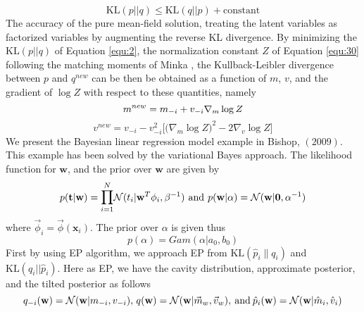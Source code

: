 \documentclass[]{article}
\begin{document}
\begin{equation}
	\text{KL}(p||q) \leq \text{KL}(q||p) + \text{constant}
	\label{equ:2}
\end{equation}
The accuracy of the pure mean-field solution, treating the latent variables as factorized variables by augmenting the reverse KL divergence. 
By minimizing the $\text{KL}(p||q)$ of Equation \ref{equ:2}, the normalization constant $Z$ of Equation \ref{equ:30} following the matching moments of Minka \cite{minka2001ep}, the Kullback-Leibler divergence between $p$ and $q^{new}$ can be then be obtained as a function of $m$, $v$, and the gradient of $\log Z$ with respect to these quantities, namely
\begin{equation}
	m^{new} = m_{-i} + v_{-i} \nabla_m \log Z
	\notag
\end{equation}
\begin{equation}
	v^{new} = v_{-i} - v_{-i}^2 \bigg[\bigg(\nabla_m \log Z\bigg)^2 - 2\nabla_v \log Z\bigg]
	\label{equ:3}
\end{equation}
We present the Bayesian linear regression model example in Bishop, $(2009)$. This example has been solved by the variational Bayes approach. The likelihood function for $\mathbf{w}$, and the prior over $\mathbf{w}$ are given by
\begin{equation}
	p(\mathbf{t}|\mathbf{w}) = \mathlarger \prod_{i=1}^{N} \mathcal{N}(t_i|\mathbf{w}^T\phi_i,\beta^{-1}) \hspace{0.05in} \text{and} \hspace{0.05in} p(\mathbf{w}|\alpha) = \mathcal{N}(\mathbf{w}|\mathbf{0},\alpha^{-1})
	\label{equ:4}
\end{equation}  
where $\vec{\phi}_i = \vec{\phi}(\mathbf{x}_i)$. The prior over $\alpha$ is given thus
\begin{equation}
	p(\alpha) = Gam(\alpha|a_0,b_0)
	\label{equ:5}
\end{equation}
First by using EP algorithm, we approach EP from $\text{KL}(\hat{p}_i\|q_i)$ and $\text{KL}(q_i||\hat{p}_i)$. Here as EP, we have the cavity distribution, approximate posterior, and the tilted posterior as follows
\begin{equation}
	q_{-i}(\mathbf{w}) = \mathcal{N}(\mathbf{w}|m_{-i},v_{-i}), \hspace{0.02in} q(\mathbf{w}) = \mathcal{N}(\mathbf{w}|\vec{m}_w,\vec{v}_w), \hspace{0.03in} \text{and} \hspace{0.03in}\hat{p}_i(\mathbf{w}) = \mathcal{N}(\mathbf{w}|\hat{m}_i,\hat{v}_i)
	\label{equ:6}
\end{equation}
\end{document}
